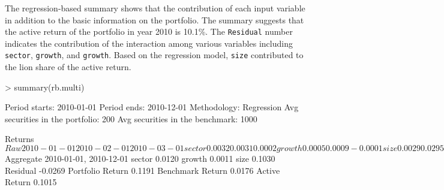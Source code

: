 The regression-based summary shows that the contribution of each input
variable in addition to the basic information on the portfolio. The
summary suggests that the active return of the portfolio in year 2010
is 10.1\%. The \texttt{Residual} number indicates the contribution
of the interaction among various variables including \texttt{sector},
\texttt{growth}, and \texttt{growth}. Based on the
regression model, \texttt{size} contributed to the lion share of the
active return.

\begin{Schunk}
\begin{Sinput}
> summary(rb.multi)
\end{Sinput}
\begin{Soutput}
Period starts:                       2010-01-01
Period ends:                         2010-12-01
Methodology:                         Regression
Avg securities in the portfolio:     200
Avg securities in the benchmark:     1000

Returns 
$Raw
                 2010-01-01 2010-02-01 2010-03-01
sector               0.0032     0.0031     0.0002
growth               0.0005     0.0009    -0.0001
size                 0.0029     0.0295     0.0105
Residual             0.0081    -0.0172    -0.0302
Portfolio Return    -0.0291     0.0192     0.0298
Benchmark Return    -0.0438     0.0029     0.0494
Active Return        0.0147     0.0163    -0.0196
                 2010-04-01 2010-05-01 2010-06-01
sector               0.0016     0.0039     0.0070
growth               0.0001     0.0002     0.0004
size                 0.0135     0.0037     0.0018
Residual            -0.0040     0.0310     0.0183
Portfolio Return    -0.0080    -0.0381     0.0010
Benchmark Return    -0.0192    -0.0769    -0.0266
Active Return        0.0113     0.0388     0.0276
                 2010-07-01 2010-08-01 2010-09-01
sector               0.0016     0.0047    -0.0022
growth              -0.0005     0.0005    -0.0006
size                 0.0064     0.0000     0.0096
Residual            -0.0324     0.0173    -0.0220
Portfolio Return     0.0515    -0.0119     0.0393
Benchmark Return     0.0764    -0.0344     0.0545
Active Return       -0.0249     0.0225    -0.0152
                 2010-10-01 2010-11-01 2010-12-01
sector               0.0015    -0.0044    -0.0082
growth              -0.0010    -0.0004     0.0010
size                 0.0022     0.0130     0.0056
Residual             0.0137     0.0175    -0.0247
Portfolio Return     0.0414    -0.0036     0.0260
Benchmark Return     0.0249    -0.0293     0.0523
Active Return        0.0165     0.0257    -0.0263

$Aggregate
                 2010-01-01, 2010-12-01
sector                           0.0120
growth                           0.0011
size                             0.1030
Residual                        -0.0269
Portfolio Return                 0.1191
Benchmark Return                 0.0176
Active Return                    0.1015
\end{Soutput}
\end{Schunk}

